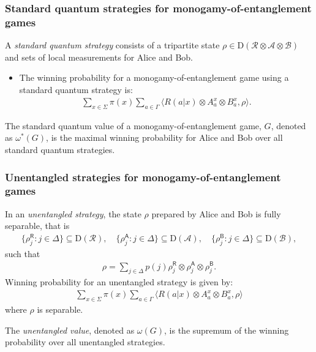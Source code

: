 \documentclass{beamer}
\newcommand{\tinyspace}{\mspace{1mu}}
\newcommand{\biggip}[2]{\biggl\langle #1, #2 \biggr\rangle}
\newcommand{\biggnorm}[1]{\biggl\lVert\tinyspace #1 \tinyspace\biggr\rVert}
\def\A{\mathcal{A}}
\def\B{\mathcal{B}}
\def\R{\mathcal{R}}
\newcommand{\setft}[1]{\mathrm{#1}}
\newcommand{\Density}{\setft{D}}
\newcommand{\reg}[1]{\mathsf{#1}}
\begin{document}
\begin{frame}
	\frametitle{Standard quantum strategies for monogamy-of-entanglement games}
	A \emph{standard quantum strategy} consists of a tripartite state $\rho \in \Density(\R \otimes \A \otimes \B)$ and sets of local measurements for Alice and Bob. 
	\begin{itemize}
		\item The winning probability for a monogamy-of-entanglement game using a standard quantum strategy is:
			\begin{align*}
				\sum_{x \in \Sigma} \pi(x) \sum_{a \in \Gamma} \biggip{R(a|x) \otimes A_a^x \otimes B_a^x}{\rho}.
			\end{align*}
	\end{itemize}
The standard quantum value of a monogamy-of-entanglement game, $G$, denoted as $\omega^*(G)$, is the maximal winning probability for Alice and Bob over all standard quantum strategies. 	
\end{frame}

\begin{frame}
	\frametitle{Unentangled strategies for monogamy-of-entanglement games}
	In an \emph{unentangled strategy}, the state $\rho$ prepared by Alice and Bob is fully separable, that is
	\begin{align*}
		\{ \rho_j^{\reg{R}} : j \in \Delta \} \subseteq \Density(\R), \quad \{ \rho_j^{\reg{A}} : j \in \Delta \} \subseteq \Density(\A), \quad \{ \rho_j^{\reg{B}} : j \in \Delta \} \subseteq \Density(\B),
	\end{align*}
	such that 
	\begin{align*}
		\rho = \sum_{j \in \Delta} p(j) \rho_j^{\reg{R}} \otimes \rho_j^{\reg{A}} \otimes \rho_j^{\reg{B}}.
	\end{align*}
	\vspace{5mm}
	\pause
	Winning probability for an unentangled strategy is given by:
	\begin{align*}
		\sum_{x \in \Sigma} \pi(x) \sum_{a \in \Gamma} \biggip{R(a|x) \otimes A_a^x \otimes B_a^x}{\rho}
	\end{align*}
where $\rho$ is separable. 

	The \emph{unentangled value}, denoted as $\omega(G)$, is the supremum of the winning probability over all unentangled strategies.	
\end{frame}
\end{document}

